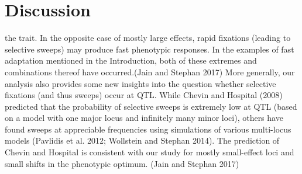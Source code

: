\documentclass{article}
\begin{document}
\section{Discussion}

the trait. In the opposite case of mostly large effects, rapid fixations (leading to selective sweeps) may produce fast phenotypic responses. In the examples of fast adaptation mentioned in the Introduction, both of these extremes and combinations thereof have occurred.(Jain and Stephan 2017)
More generally, our analysis also provides some new insights into the question whether selective fixations (and thus sweeps) occur at QTL. While Chevin and Hospital (2008) predicted that the probability of selective sweeps is extremely low at QTL (based on a model with one major locus and infinitely many minor loci), others have found sweeps at appreciable frequencies using simulations of various multi-locus models (Pavlidis et al. 2012; Wollstein and Stephan 2014). The prediction of Chevin and Hospital is consistent with our study for mostly small-effect loci and small shifts in the phenotypic optimum. (Jain and Stephan 2017)



\end{document}

